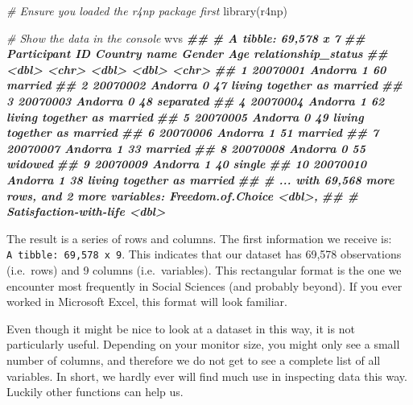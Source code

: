 \documentclass[
]{book}
\newenvironment{Shaded}{\begin{snugshade}}{\end{snugshade}}
\newcommand{\CommentTok}[1]{\textcolor[rgb]{0.56,0.35,0.01}{\textit{#1}}}
\newcommand{\DocumentationTok}[1]{\textcolor[rgb]{0.56,0.35,0.01}{\textbf{\textit{#1}}}}
\newcommand{\FunctionTok}[1]{\textcolor[rgb]{0.00,0.00,0.00}{#1}}
\newcommand{\NormalTok}[1]{#1}
\begin{document}
\begin{Shaded}
\begin{Highlighting}[]
\CommentTok{\# Ensure you loaded the \textquotesingle{}r4np\textquotesingle{} package first}
\FunctionTok{library}\NormalTok{(r4np)}

\CommentTok{\# Show the data in the console}
\NormalTok{wvs}
\DocumentationTok{\#\# \# A tibble: 69,578 x 7}
\DocumentationTok{\#\#    \textasciigrave{}Participant ID\textasciigrave{} \textasciigrave{}Country name\textasciigrave{} Gender   Age relationship\_status       }
\DocumentationTok{\#\#               \textless{}dbl\textgreater{} \textless{}chr\textgreater{}           \textless{}dbl\textgreater{} \textless{}dbl\textgreater{} \textless{}chr\textgreater{}                     }
\DocumentationTok{\#\#  1         20070001 Andorra             1    60 married                   }
\DocumentationTok{\#\#  2         20070002 Andorra             0    47 living together as married}
\DocumentationTok{\#\#  3         20070003 Andorra             0    48 separated                 }
\DocumentationTok{\#\#  4         20070004 Andorra             1    62 living together as married}
\DocumentationTok{\#\#  5         20070005 Andorra             0    49 living together as married}
\DocumentationTok{\#\#  6         20070006 Andorra             1    51 married                   }
\DocumentationTok{\#\#  7         20070007 Andorra             1    33 married                   }
\DocumentationTok{\#\#  8         20070008 Andorra             0    55 widowed                   }
\DocumentationTok{\#\#  9         20070009 Andorra             1    40 single                    }
\DocumentationTok{\#\# 10         20070010 Andorra             1    38 living together as married}
\DocumentationTok{\#\# \# ... with 69,568 more rows, and 2 more variables: Freedom.of.Choice \textless{}dbl\textgreater{},}
\DocumentationTok{\#\# \#   Satisfaction{-}with{-}life \textless{}dbl\textgreater{}}
\end{Highlighting}
\end{Shaded}

The result is a series of rows and columns. The first information we receive is: \texttt{A\ tibble:\ 69,578\ x\ 9}. This indicates that our dataset has 69,578 observations (i.e.~rows) and 9 columns (i.e.~variables). This rectangular format is the one we encounter most frequently in Social Sciences (and probably beyond). If you ever worked in Microsoft Excel, this format will look familiar.

Even though it might be nice to look at a dataset in this way, it is not particularly useful. Depending on your monitor size, you might only see a small number of columns, and therefore we do not get to see a complete list of all variables. In short, we hardly ever will find much use in inspecting data this way. Luckily other functions can help us.
\end{document}
